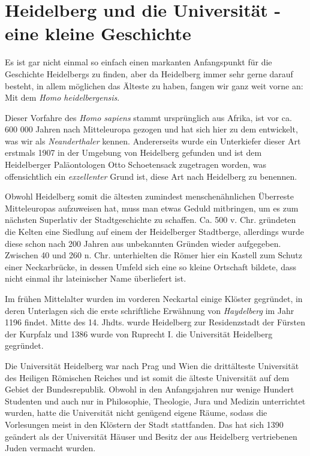 
\section[Heidelberg und die Universität ]{Heidelberg und die Universität - eine kleine Geschichte}

Es ist gar nicht einmal so einfach einen markanten Anfangspunkt für die Geschichte Heidelbergs zu finden, aber da Heidelberg immer sehr gerne darauf besteht, in allem möglichen das Älteste zu haben, fangen wir ganz weit vorne an: Mit dem \textit{Homo heidelbergensis}.

Dieser Vorfahre des \textit{Homo sapiens} stammt ursprünglich aus Afrika, ist vor ca. 600 000 Jahren nach Mitteleuropa gezogen und hat sich hier zu dem entwickelt, was wir als \textit{Neanderthaler} kennen. Andererseits wurde ein Unterkiefer dieser Art erstmals 1907 in der Umgebung von Heidelberg gefunden und ist dem Heidelberger Paläontologen Otto Schoetensack zugetragen worden, was offensichtlich ein \textit{exzellenter} Grund ist, diese Art nach Heidelberg zu benennen.

Obwohl Heidelberg somit die ältesten zumindest menschenähnlichen Überreste Mitteleuropas aufzuweisen hat, muss man etwas Geduld mitbringen, um es zum nächsten Superlativ der Stadtgeschichte zu schaffen. Ca. 500 v. Chr. gründeten die Kelten eine Siedlung auf einem der Heidelberger Stadtberge, allerdings wurde diese schon nach 200 Jahren aus unbekannten Gründen wieder aufgegeben. Zwischen 40 und 260 n. Chr. unterhielten die Römer hier ein Kastell zum Schutz einer Neckarbrücke, in dessen Umfeld sich eine so kleine Ortschaft bildete, dass nicht einmal ihr lateinischer Name überliefert ist.

Im frühen Mittelalter wurden im vorderen Neckartal einige Klöster gegründet, in deren Unterlagen sich die erste schriftliche Erwähnung von \textit{Haydelberg} im Jahr 1196 findet. Mitte des 14. Jhdts. wurde Heidelberg zur Residenzstadt der Fürsten der Kurpfalz und 1386 wurde von Ruprecht I. die Universität Heidelberg gegründet.

Die Universität Heidelberg war nach Prag und Wien die drittälteste Universität des Heiligen Römischen Reiches und ist somit die älteste Universität auf dem Gebiet der Bundesrepublik. Obwohl in den Anfangsjahren nur wenige Hundert Studenten und auch nur in Philosophie, Theologie, Jura und Medizin unterrichtet wurden, hatte die Universität nicht genügend eigene Räume, sodass die Vorlesungen meist in den Klöstern der Stadt stattfanden. Das hat sich 1390 geändert als der Universität Häuser und Besitz der aus Heidelberg vertriebenen Juden vermacht wurden.

